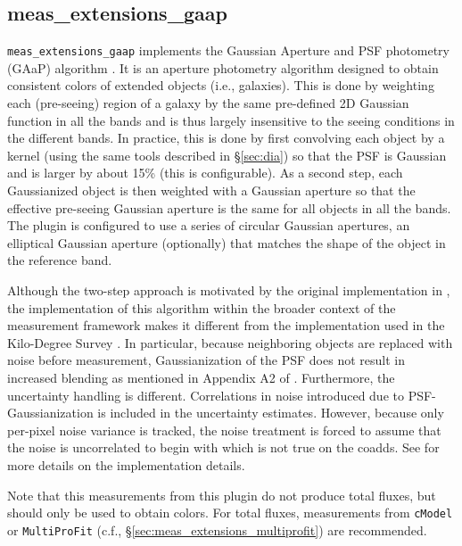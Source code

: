 \subsection{meas\_extensions\_gaap}
\label{sec:meas_extensions_gaap}

\texttt{meas\_extensions\_gaap} implements the Gaussian Aperture and PSF photometry (GAaP) algorithm \citep{2008A&A...482.1053K}.
It is an aperture photometry algorithm designed to obtain consistent colors of extended objects (i.e., galaxies).
This is done by weighting each (pre-seeing) region of a galaxy by the same pre-defined 2D Gaussian function in all the bands and is thus largely insensitive to the seeing conditions in the different bands.
In practice, this is done by first convolving each object by a kernel (using the same tools described in \S\ref{sec:dia}) so that the PSF is Gaussian and is larger by about 15\% (this is configurable).
As a second step, each Gaussianized object is then weighted with a Gaussian aperture so that the effective pre-seeing Gaussian aperture is the same for all objects in all the bands.
The plugin is configured to use a series of circular Gaussian apertures, an elliptical Gaussian aperture (optionally) that matches the shape of the object in the reference band.

Although the two-step approach is motivated by the original implementation in \cite{2008A&A...482.1053K}, the implementation of this algorithm within the broader context of the measurement framework makes it different from the implementation used in the Kilo-Degree Survey \citep[KiDS;][]{2025arXiv250319439W}.
In particular, because neighboring objects are replaced with noise before measurement, Gaussianization of the PSF does not result in increased blending as mentioned in Appendix A2 of \cite{2015MNRAS.454.3500K}.
Furthermore, the uncertainty handling is different.
Correlations in noise introduced due to PSF-Gaussianization is included in the uncertainty estimates.
However, because only per-pixel noise variance is tracked, the noise treatment is forced to assume that the noise is uncorrelated to begin with which is not true on the coadds.
See \cite{DMTN-190} for more details on the implementation details.

Note that this measurements from this plugin do not produce total fluxes, but should only be used to obtain colors.
For total fluxes, measurements from \texttt{cModel} or \texttt{MultiProFit} (c.f., \S\ref{sec:meas_extensions_multiprofit}) are recommended.
